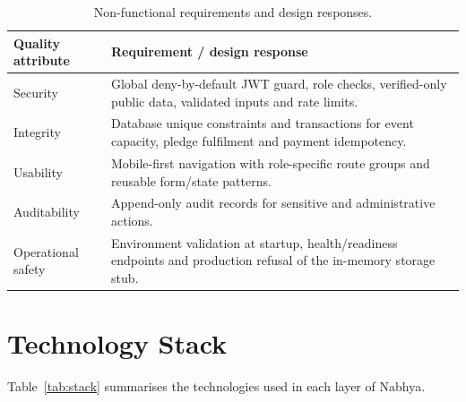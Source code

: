 \begin{table}[H]\centering
\caption{Non-functional requirements and design responses.}
\label{tab:nfr}
\begin{tabularx}{\textwidth}{|p{}|X|}
\hline
\textbf{Quality attribute} & \textbf{Requirement / design response}\\\hline
Security & Global deny-by-default JWT guard, role checks, verified-only public data, validated inputs and rate limits.\\\hline
Integrity & Database unique constraints and transactions for event capacity, pledge fulfilment and payment idempotency.\\\hline
Usability & Mobile-first navigation with role-specific route groups and reusable form/state patterns.\\\hline
Auditability & Append-only audit records for sensitive and administrative actions.\\\hline
Operational safety & Environment validation at startup, health/readiness endpoints and production refusal of the in-memory storage stub.\\\hline
\end{tabularx}
\end{table}

\section{Technology Stack}
Table~\ref{tab:stack} summarises the technologies used in each layer of Nabhya.


